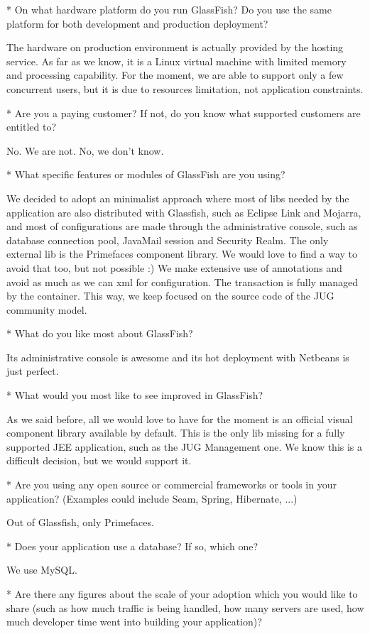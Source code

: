 \documentclass[10pt,a4paper]{report}
\begin{document}
* On what hardware platform do you run GlassFish?  Do you use the same platform
  for both development and production deployment?
  
  The hardware on production environment is actually provided by the hosting service. As far as we know, it is a Linux virtual machine with limited memory and processing capability. For the moment, we are able to support only a few concurrent users, but it is due to resources limitation, not application constraints.

* Are you a paying customer? If not, do you know what supported customers are entitled to?

No. We are not. No, we don't know.

* What specific features or modules of GlassFish are you using?

We decided to adopt an minimalist approach where most of libs needed by the application are also distributed with Glassfish, such as Eclipse Link and Mojarra, and most of configurations are made through the administrative console, such as database connection pool, JavaMail session and Security Realm. The only external lib is the Primefaces component library. We would love to find a way to avoid that too, but not possible :) We make extensive use of annotations and avoid as much as we can xml for configuration. The transaction is fully managed by the container. This way, we keep focused on the source code of the JUG community model.

* What do you like most about GlassFish?

Its administrative console is awesome and its hot deployment with Netbeans is just perfect.

* What would you most like to see improved in GlassFish?

As we said before, all we would love to have for the moment is an official visual component library available by default. This is the only lib missing for a fully supported JEE application, such as the JUG Management one. We know this is a difficult decision, but we would support it.

* Are you using any open source or commercial frameworks or tools in your application?
  (Examples could include Seam, Spring, Hibernate, ...)
  
  Out of Glassfish, only Primefaces.

* Does your application use a database? If so, which one? 

We use MySQL.

* Are there any figures about the scale of your adoption which you would like
  to share (such as how much traffic is being handled, how many servers are
  used, how much developer time went into building your application)?
  
\end{document}

